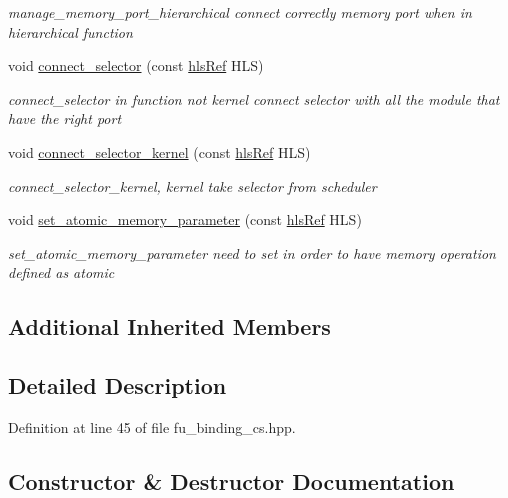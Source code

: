 \begin{DoxyCompactItemize}
\begin{DoxyCompactList}\small\item\em manage\+\_\+memory\+\_\+port\+\_\+hierarchical connect correctly memory port when in hierarchical function \end{DoxyCompactList}\item 
void \hyperlink{classfu__binding__cs_a6201940f686fadbcb4915dd44564376b}{connect\+\_\+selector} (const \hyperlink{hls_8hpp_a75d0c73923d0ddfa28c4843a802c73a7}{hls\+Ref} H\+LS)
\begin{DoxyCompactList}\small\item\em connect\+\_\+selector in function not kernel connect selector with all the module that have the right port \end{DoxyCompactList}\item 
void \hyperlink{classfu__binding__cs_a5d369fddbe9497c80625c619b78e2c9f}{connect\+\_\+selector\+\_\+kernel} (const \hyperlink{hls_8hpp_a75d0c73923d0ddfa28c4843a802c73a7}{hls\+Ref} H\+LS)
\begin{DoxyCompactList}\small\item\em connect\+\_\+selector\+\_\+kernel, kernel take selector from scheduler \end{DoxyCompactList}\item 
void \hyperlink{classfu__binding__cs_aa672ceff5ca96fa5fe84ae1582469b85}{set\+\_\+atomic\+\_\+memory\+\_\+parameter} (const \hyperlink{hls_8hpp_a75d0c73923d0ddfa28c4843a802c73a7}{hls\+Ref} H\+LS)
\begin{DoxyCompactList}\small\item\em set\+\_\+atomic\+\_\+memory\+\_\+parameter need to set in order to have memory operation defined as atomic \end{DoxyCompactList}\end{DoxyCompactItemize}
\subsection*{Additional Inherited Members}


\subsection{Detailed Description}


Definition at line 45 of file fu\+\_\+binding\+\_\+cs.\+hpp.



\subsection{Constructor \& Destructor Documentation}
\mbox{\label{classfu__binding__cs_a04aee22f90e1439e091d9e8f4251cae1}} 
